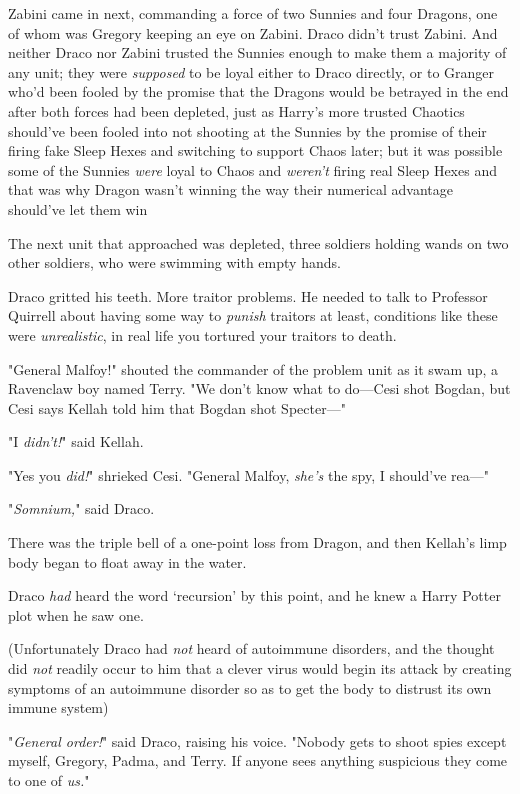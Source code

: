 Zabini came in next, commanding a force of two Sunnies and four Dragons, one of
whom was Gregory keeping an eye on Zabini. Draco didn't trust Zabini. And
neither Draco nor Zabini trusted the Sunnies enough to make them a majority of
any unit; they were \emph{supposed} to be loyal either to Draco directly, or to
Granger who'd been fooled by the promise that the Dragons would be betrayed in
the end after both forces had been depleted, just as Harry's more trusted
Chaotics should've been fooled into not shooting at the Sunnies by the promise
of their firing fake Sleep Hexes and switching to support Chaos later; but it
was possible some of the Sunnies \emph{were} loyal to Chaos and \emph{weren't}
firing real Sleep Hexes and that was why Dragon wasn't winning the way their
numerical advantage should've let them win{\el}

The next unit that approached was depleted, three soldiers holding wands on two
other soldiers, who were swimming with empty hands.

Draco gritted his teeth. More traitor problems. He needed to talk to Professor
Quirrell about having some way to \emph{punish} traitors at least, conditions
like these were \emph{unrealistic}, in real life you tortured your traitors to
death.

"General Malfoy!" shouted the commander of the problem unit as it swam up, a
Ravenclaw boy named Terry. "We don't know what to do---Cesi shot Bogdan, but
Cesi says Kellah told him that Bogdan shot Specter\mbox{---}"

"I \emph{didn't!}" said Kellah.

"Yes you \emph{did!}" shrieked Cesi. "General Malfoy, \emph{she's} the spy, I
should've rea\mbox{---}"

"\emph{Somnium,}" said Draco.

There was the triple bell of a one-point loss from Dragon, and then Kellah's
limp body began to float away in the water.

Draco \emph{had} heard the word `recursion' by this point, and he knew a Harry
Potter plot when he saw one.

(Unfortunately Draco had \emph{not} heard of autoimmune disorders, and the
thought did \emph{not} readily occur to him that a clever virus would begin its
attack by creating symptoms of an autoimmune disorder so as to get the body to
distrust its own immune system{\el})

"\emph{General order!}" said Draco, raising his voice. "Nobody gets to shoot
spies except myself, Gregory, Padma, and Terry. If anyone sees anything
suspicious they come to one of \emph{us.}"

